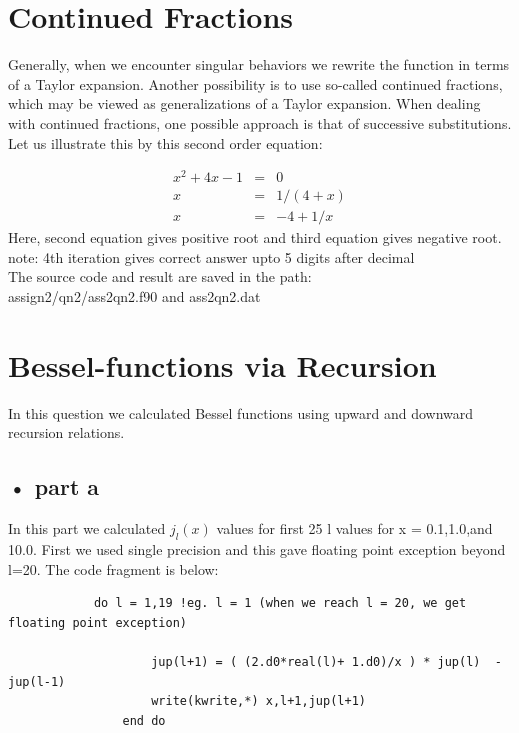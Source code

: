 \documentclass[11pt,a4paper,english]{article}
\newcommand{\beqa}{\begin{eqnarray}}
\newcommand{\eeqa}{\end{eqnarray}}
\begin{document}
	
\clearpage
\section{Continued Fractions}

	Generally, when we encounter singular behaviors we rewrite 
	the function in terms of a Taylor expansion. 
	Another possibility is to use so-called continued fractions, which may be
	viewed as generalizations of a Taylor expansion. When dealing with continued fractions, 
	one possible approach is that of successive substitutions. 
	Let us illustrate this by this second order equation:	

	\beqa 
		x^2 + 4x -1 &=& 0 \\
        x    &=& 1/ (4 + x) \\  %
        x    &=& -4 + 1/x    %
     \eeqa
     Here, second equation gives positive root and third equation gives negative root.\\ 
 	note: 4th iteration gives correct answer upto 5 digits after decimal\\
 	The source code and result are saved in the path:\\
 	assign2/qn2/ass2qn2.f90  and ass2qn2.dat\\
 	
\clearpage
\section{Bessel-functions via Recursion}

	In this question we calculated Bessel functions using upward and downward recursion relations.
	

	\subsection{• part a}
		In this part we calculated $j_l(x)$ values for first 25 l values for x = 0.1,1.0,and 10.0.
		First we used single precision and this gave floating point exception beyond l=20.
		The code fragment is below:
		
		\begin{verbatim}
			do l = 1,19 !eg. l = 1 (when we reach l = 20, we get floating point exception)
        
        			jup(l+1) = ( (2.d0*real(l)+ 1.d0)/x ) * jup(l)  - jup(l-1)
        			write(kwrite,*) x,l+1,jup(l+1)
        		end do 
		\end{verbatim}
		
\end{document}
